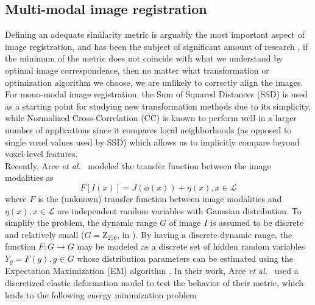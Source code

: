 \subsection{Multi-modal image registration}

Defining an adequate similarity metric is arguably the most important aspect of image registration, and has been the subject of significant amount of research \cite{Sotiras2013}, if
the minimum of the metric does not coincide with what we understand by optimal image correspondence, then no matter what transformation or optimization algorithm we choose, we are
unlikely to correctly align the images. For mono-modal image registration, the Sum of Squared Distances (SSD) is used as a starting point for studying new transformation methods due to
its simplicity, while Normalized Cross-Correlation (CC) is known to perform well in a larger number of applications since it compares local neighborhoods (as opposed to single
voxel values used by SSD) which allows us to implicitly compare beyond voxel-level features.\\

Recently, Arce {\it et al.}~\cite{Arce-santana2014} modeled the transfer function between the image modalities as
\begin{equation}\label{eq:arce_model}
    F[I(x)] = J(\phi(x)) + \eta(x), x\in \mathcal{L}
\end{equation}
where $F$ is the (unknown) transfer function between image modalities and $\eta(x), x\in \mathcal{L}$ are independent random variables with Gaussian distribution. To simplify
the problem, the dynamic range $G$ of image $I$ is assumed to be discrete and relatively small ($G = \mathrm{Z}_{256}$, in \cite{Arce-santana2014}). By having a discrete
dynamic range, the function $F: G \rightarrow G$ may be modeled as a discrete set of hidden random variables $Y_g = F(g), g\in G$ whose distribution parameters
can be estimated using the Expectation Maximization (EM) algorithm \cite{Dempster1977}. In their work, Arce {\it et al.}~\cite{Arce-santana2014} used a discretized elastic
deformation model to test the behavior of their metric, which leads to the following energy minimization problem

